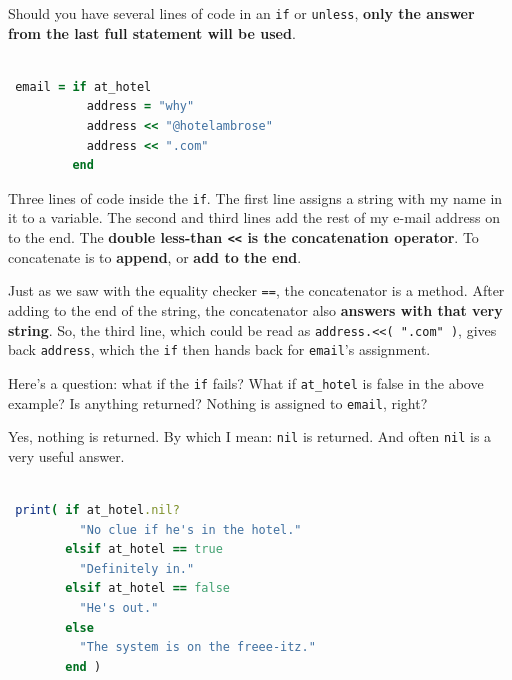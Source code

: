 \documentclass[10pt,twoside]{report}
\begin{document}
Should you have several lines of code in an
\lstinline[breaklines=true]|if| or
\lstinline[breaklines=true]|unless|, {\bf only the answer from the
  last full statement will be used}.


\begin{lstlisting}[basicstyle=\ttfamily\color{basiccolor},
    commentstyle = \ttfamily\color{commentcolor},
    keywordstyle=\ttfamily\color{keywordscolor},
    stringstyle=\color{stringcolor},
    language=Ruby,
    basicstyle=\small\ttfamily,
    showstringspaces=false,
  ]

 email = if at_hotel 
           address = "why" 
           address << "@hotelambrose"
           address << ".com"
         end

\end{lstlisting}


Three lines of code inside the \lstinline[breaklines=true]|if|.  The
first line assigns a string with my name in it to a variable. The
second and third lines add the rest of my e-mail address on to the
end.  The {\bf double less-than \lstinline[breaklines=true]|<<| is the
  concatenation operator}.  To concatenate is to {\bf append}, or {\bf
  add to the end}.

Just as we saw with the equality checker
\lstinline[breaklines=true]|==|, the concatenator is a method.  After
adding to the end of the string, the concatenator also {\bf answers
  with that very string}.  So, the third line, which could be read as
\lstinline[breaklines=true]|address.<<( ".com" )|, gives back
\lstinline[breaklines=true]|address|, which the
\lstinline[breaklines=true]|if| then hands back for
\lstinline[breaklines=true]|email|'s assignment.

Here's a question: what if the \lstinline[breaklines=true]|if| fails?
What if \lstinline[breaklines=true]|at_hotel| is false in the above
example? Is anything returned?  Nothing is assigned to
\lstinline[breaklines=true]|email|, right?

Yes, nothing is returned.  By which I mean:
\lstinline[breaklines=true]|nil| is returned.  And often
\lstinline[breaklines=true]|nil| is a very useful answer.


\begin{lstlisting}[basicstyle=\ttfamily\color{basiccolor},
    commentstyle = \ttfamily\color{commentcolor},
    keywordstyle=\ttfamily\color{keywordscolor},
    stringstyle=\color{stringcolor},
    language=Ruby,
    basicstyle=\small\ttfamily,
    showstringspaces=false,
  ]

 print( if at_hotel.nil?
          "No clue if he's in the hotel."
        elsif at_hotel == true
          "Definitely in."
        elsif at_hotel == false
          "He's out."
        else
          "The system is on the freee-itz."
        end )

\end{lstlisting}
\end{document}
